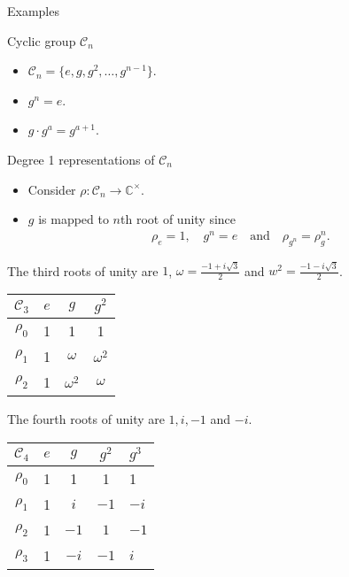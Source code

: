 \documentclass[handout, 10pt]{beamer}
\newcommand{\Cyc}{\mathcal{C}}
\newcommand{\CC}{\mathbb{C}}
\begin{document}
\begin{frame}[allowframebreaks]{Examples}
		\begin{block}{Cyclic group $\Cyc_n$}
			\begin{itemize}
				\item $\Cyc_n = \{ e, g, g^2, \dots, g^{n-1}\}$.
				
				\item $g^n = e$.
				
				\item $g \cdot g^a = g^{a+1}$.
			\end{itemize}
		\end{block}
		
		\begin{block}{Degree 1 representations of $\Cyc_n$}
			\begin{itemize}
				\item Consider $\rho: \Cyc_n \rightarrow \CC^\times$.
				
				\item $g$ is mapped to $n$th root of unity since
				\begin{align*}
					\rho_e = 1, \quad g^n = e \quad \text{and} \quad \rho_{g^n} = \rho_g^n.
				\end{align*}
			\end{itemize}
		\end{block}
		
		\begin{example}[$\Cyc_3$]
			The third roots of unity are $1$, $\omega = \frac{-1+i\sqrt{3}}{2}$ and $w^2 = \frac{-1-i\sqrt{3}}{2}$.
			\begin{table}
				\centering
				\begin{tabular}{c | c c c}
					$\Cyc_3$ & $e$ & $g$        & $g^2$      \\ \hline
					$\rho_0$          & 1   & 1          & 1          \\
					$\rho_1$          & 1   & $\omega$   & $\omega^2$ \\
					$\rho_2$          & 1   & $\omega^2$ & $\omega$
				\end{tabular}
			\end{table}
		\end{example}
		
		\begin{example}[$\Cyc_4$]
			The fourth roots of unity are $1,i,-1$ and $-i$.
			\begin{table}
				\centering
				\begin{tabular}{c | c c cl}
					$\Cyc_4$ & $e$ & $g$  & $g^2$ & $g^3$ \\ \hline
					$\rho_0$           & 1   & 1    & 1     & 1     \\
					$\rho_1$           & 1   & $i$  & $-1$  & $-i$  \\
					$\rho_2$           & 1   & $-1$ & $1$  & $-1$   \\
					$\rho_3$           & 1   & $-i$ & $-1$   & $i$
				\end{tabular}
			\end{table}
		\end{example}
		

\end{frame}
\end{document}
